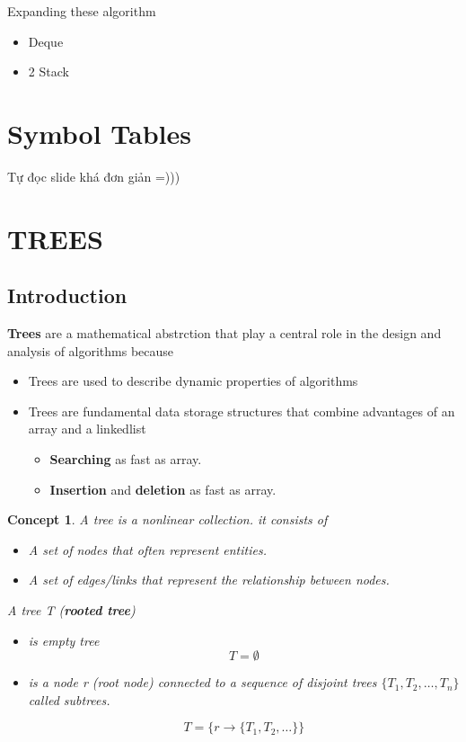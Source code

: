 \documentclass{article}
\newtheorem*{concept}{Concept}
\begin{document}
Expanding these algorithm 
\begin{itemize}
    \item Deque
    \item 2 Stack
\end{itemize}

\section{Symbol Tables}
Tự đọc slide khá đơn giản =)))

\section{TREES}

\subsection{Introduction}
\textbf{Trees} are a mathematical abstrction that play a central role in the design and analysis of algorithms because 
\begin{itemize}
    \item Trees are used to describe dynamic properties of algorithms
    \item Trees are fundamental data storage structures that combine advantages of an array and a linkedlist
        \begin{itemize}
            \item \textbf{Searching} as fast as array.
            \item \textbf{Insertion} and \textbf{deletion} as fast as array.
        \end{itemize}
\end{itemize}

\begin{concept}\:


    A tree is a nonlinear collection. it consists of 
    \begin{itemize}
        \item A set of nodes that often represent entities.
        \item A set of edges/links that represent the relationship between nodes.
    \end{itemize}
    
    A tree T (\textbf{rooted tree})
\begin{itemize}
    \item is empty tree
    $$T = \emptyset$$
    
    \item is a node r (root node) connected to a sequence of disjoint trees $\{T_1, T_2, \dots, T_n\}$ called subtrees.
    
    $$T = \{ r \xrightarrow[]{} \{T_1, T_2, \dots \}\}$$
\end{itemize}
\end{concept}
\end{document}
